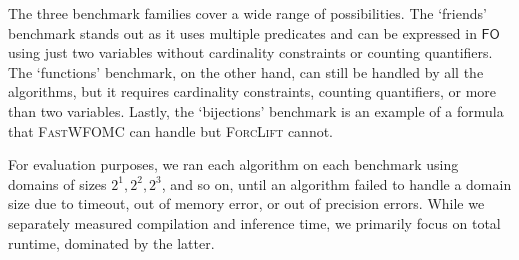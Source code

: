 \documentclass[a4paper,UKenglish,cleveref, autoref, thm-restate]{lipics-v2021}
\newcommand{\FO}{$\mathsf{FO}$}
\newcommand{\UFO}{$\mathsf{UFO}^{2} + \mathsf{CC}$}
\newcommand{\Cranetwo}{\textsc{Gantry}}
\begin{document}

The three benchmark families cover a wide range of possibilities. The
`friends' benchmark stands out as it uses multiple predicates and can be
expressed in \FO{} using just two variables without cardinality constraints or
counting quantifiers. The `functions' benchmark, on the other hand, can still be
handled by all the algorithms, but it requires cardinality constraints, counting
quantifiers, or more than two variables. Lastly, the `bijections' benchmark is
an example of a formula that \textsc{FastWFOMC} can handle but \textsc{ForcLift}
cannot.



For evaluation purposes, we ran each algorithm on each benchmark using domains
of sizes $2^{1}, 2^{2}, 2^{3}$, and so on, until an algorithm failed to handle a
domain size due to timeout, out of memory error, or out of precision errors.
While we separately measured compilation and inference time, we primarily focus
on total runtime, dominated by the latter.




\end{document}
